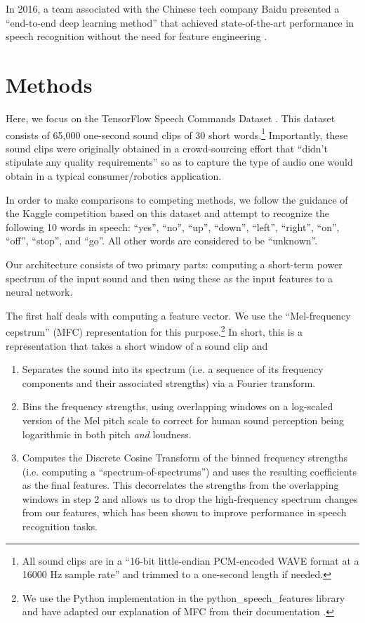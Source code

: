 \documentclass[12pt]{article}
\begin{document}
In 2016, a team associated with the Chinese tech company Baidu presented a ``end-to-end deep learning method'' that achieved state-of-the-art performance in speech recognition without the need for feature engineering \cite{amodei_et_al_deep_2016}.

\section{Methods}

Here, we focus on the TensorFlow Speech Commands Dataset \cite{warden_speech_2017}. This dataset consists of 65,000 one-second sound clips of 30 short words.\footnote{All sound clips are in a ``16-bit little-endian PCM-encoded WAVE format at a 16000 Hz sample rate'' and trimmed to a one-second length if needed.} Importantly, these sound clips were originally obtained in a crowd-sourcing effort that ``didn't stipulate any quality requirements'' so as to capture the type of audio one would obtain in a typical consumer/robotics application.

In order to make comparisons to competing methods, we follow the guidance of the Kaggle competition \cite{kaggle.com_tensorflow_nodate} based on this dataset and attempt to recognize the following 10 words in speech: ``yes'', ``no'', ``up'', ``down'', ``left'', ``right'', ``on'', ``off'', ``stop'', and ``go''. All other words are considered to be ``unknown''.

Our architecture consists of two primary parts: computing a short-term power spectrum of the input sound and then using these as the input features to a neural network.

The first half deals with computing a feature vector. We use the ``Mel-frequency cepstrum'' (MFC) representation for this purpose.\footnote{We use the Python implementation in the python\_speech\_features library and have adapted our explanation of MFC from their documentation \cite{james_lyons_python_speech_features:_nodate}.} In short, this is a representation that takes a short window of a sound clip and
\begin{enumerate}
	\item Separates the sound into its spectrum (i.e. a sequence of its frequency components and their associated strengths) via a Fourier transform.
	\item Bins the frequency strengths, using overlapping windows on a log-scaled version of the Mel pitch scale to correct for human sound perception being logarithmic in both pitch \emph{and} loudness.
	\item Computes the Discrete Cosine Transform of the binned frequency strengths (i.e. computing a ``spectrum-of-spectrums'') and uses the resulting coefficients as the final features. This decorrelates the strengths from the overlapping windows in step 2 and allows us to drop the high-frequency spectrum changes from our features, which has been shown to improve performance in speech recognition tasks.
\end{enumerate}
\end{document}
